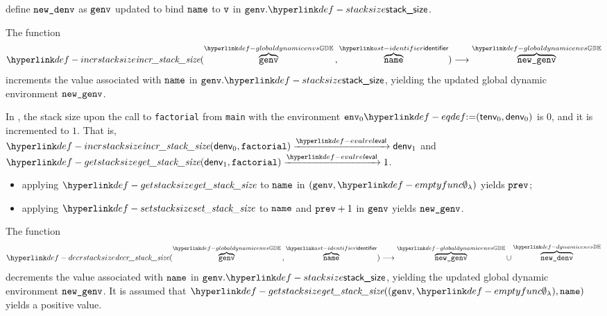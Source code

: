 \ProseParagraph
define $\newdenv$ as $\genv$ updated to bind $\name$ to $\vv$ in $\genv.\stacksize$.

\FormallyParagraph
\begin{mathpar}
\end{mathpar}

\hypertarget{def-incrstacksize}{}
The function
\[
\incrstacksize(\overname{\genv}{\globaldynamicenvs} \aslsep \overname{\name}{\identifier}) \aslto
\overname{\newgenv}{\globaldynamicenvs}
\]
increments the value associated with $\name$ in $\genv.\stacksize$, yielding the updated global dynamic environment $\newgenv$.

In , the stack size upon the call to \verb|factorial| from \verb|main|
with the environment $\env_0 \eqdef (\tenv_0, \denv_0)$ is $0$, and it is incremented to $1$.
That is, \\
$\incrstacksize(\denv_0, \factorial) \evalarrow \denv_1$
and\\
$\getstacksize(\denv_1, \factorial) \evalarrow 1$.

\ProseParagraph
\AllApply
\begin{itemize}
  \item applying $\getstacksize$ to $\name$ in $(\genv, \emptyfunc)$ yields $\vprev$;
  \item applying $\setstacksize$ to $\name$ and $\vprev + 1$ in $\genv$ yields $\newgenv$.
\end{itemize}

\FormallyParagraph
\begin{mathpar}
\end{mathpar}

\hypertarget{def-decrstacksize}{}
The function
\[
\decrstacksize(\overname{\genv}{\globaldynamicenvs} \aslsep \overname{\name}{\identifier}) \aslto
\overname{\newgenv}{\globaldynamicenvs} \cup \overname{\newdenv}{\dynamicenvs}
\]
decrements the value associated with $\name$ in $\genv.\stacksize$, yielding the updated global dynamic environment $\newgenv$.
It is assumed that $\getstacksize((\genv, \emptyfunc), \name)$ yields a positive value.

